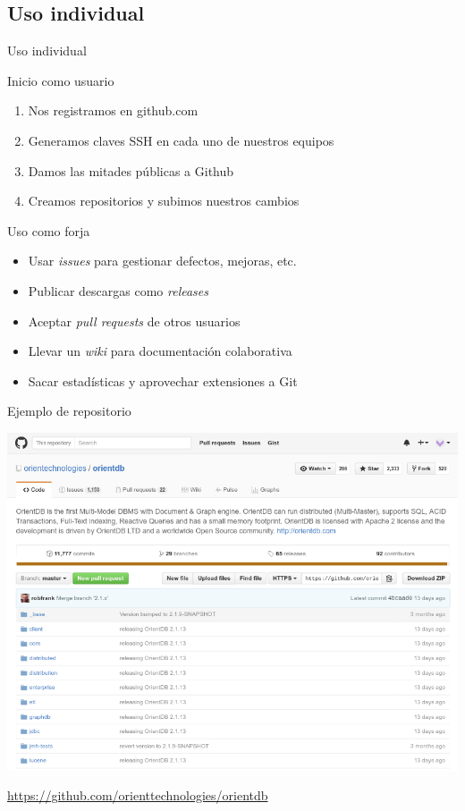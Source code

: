 \documentclass[xcolor=svgnames]{beamer}
\begin{document}
\subsection{Uso individual}

\begin{frame}{Uso individual}
  \begin{block}{Inicio como usuario}
    \begin{enumerate}
    \item Nos registramos en github.com
    \item Generamos claves SSH en cada uno de nuestros equipos
    \item Damos las mitades públicas a Github
    \item Creamos repositorios y subimos nuestros cambios
    \end{enumerate}
  \end{block}

  \begin{block}{Uso como forja}
    \begin{itemize}
    \item Usar \emph{issues} para gestionar defectos, mejoras, etc.
    \item Publicar descargas como \emph{releases}
    \item Aceptar \emph{pull requests} de otros usuarios
    \item Llevar un \emph{wiki} para documentación colaborativa
    \item Sacar estadísticas y aprovechar extensiones a Git
    \end{itemize}
  \end{block}
\end{frame}

\begin{frame}{Ejemplo de repositorio}
  \begin{center}
    \includegraphics[width=.9\textwidth,height=.8\textheight,keepaspectratio]{orientdb-repo}

    \url{https://github.com/orienttechnologies/orientdb}
  \end{center}
\end{frame}
\end{document}
